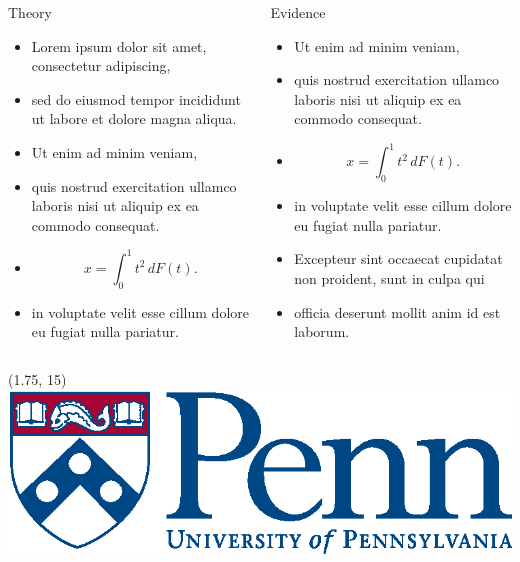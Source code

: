 \documentclass[12pt, final]{beamer}
\newlength{\onecolwid}
\newlength{\twocolwid}
\begin{document}
\begin{frame}[t]
\begin{columns}[t]
\begin{column}{\twocolwid}
      \begin{columns}[t]
        \begin{column}{\onecolwid}
          \begin{block}{Theory}
            \begin{itemize}
              \item Lorem ipsum \alert{dolor} sit amet, consectetur adipiscing,
              \item sed do eiusmod tempor incididunt ut labore et dolore magna aliqua.
              \item Ut enim ad minim veniam,
              \item quis nostrud exercitation ullamco laboris nisi ut aliquip ex ea commodo consequat.
              \item $$x = \int_0^1 t^2 \,dF(t).$$
              \item in voluptate velit \alert{esse cillum dolore} eu fugiat nulla pariatur.
            \end{itemize}
          \end{block}
        \end{column}
        \begin{column}{\onecolwid}
          \begin{block}{Evidence}
            \begin{itemize}
              \item Ut enim ad minim veniam,
              \item quis nostrud exercitation ullamco laboris nisi ut aliquip ex ea commodo consequat.
              \item $$x = \int_0^1 t^2 \,dF(t).$$
              \item in voluptate velit \alert{esse cillum dolore} eu fugiat nulla pariatur.
              \item Excepteur sint occaecat cupidatat non proident, sunt in culpa qui
              \item officia deserunt mollit anim id est laborum.
            \end{itemize}
          \end{block}
        \end{column}
      \end{columns}
    \end{column}
  \end{columns}

  \begin{textblock}{10}(1.75, 15)
   \includegraphics[scale=2]{penn}
  \end{textblock}

\end{frame}
\end{document}
